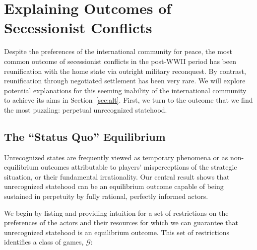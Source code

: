 \section{Explaining Outcomes of Secessionist Conflicts} 
\label{sec:main}

Despite the preferences of the international community for peace, the most common outcome of secessionist conflicts in the post-WWII period has been reunification with the home state via outright military reconquest. By contrast, reunification through negotiated settlement has been very rare. We will explore potential explanations for this seeming inability of the international community to achieve its aims in Section~\ref{sec:alt}. First, we turn to the outcome that we find the most puzzling: perpetual unrecognized statehood.

\subsection{The ``Status Quo'' Equilibrium} 
\label{sec:mainproof}
Unrecognized states are frequently viewed as temporary phenomena or as non-equilibrium outcomes attributable to players' misperceptions of the strategic situation, or their fundamental irrationality. Our central result shows that unrecognized statehood can be an equilibrium outcome capable of being sustained in perpetuity by fully rational, perfectly informed actors. 

We begin by listing and providing intuition for a set of restrictions on the preferences of the actors and their resources for which we can guarantee that unrecognized statehood is an equilibrium outcome. This set of restrictions identifies a class of games, $\mathcal{G}$: 


